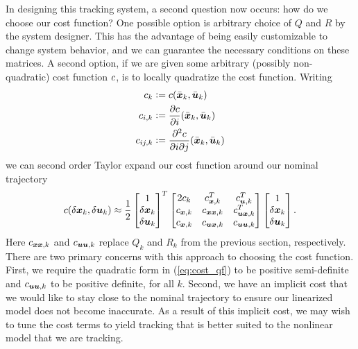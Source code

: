 In designing this tracking system, a second question now occurs: how do we choose our cost function? One possible option is arbitrary choice of $Q$ and $R$ by the system designer. This has the advantage of being easily customizable to change system behavior, and we can guarantee the necessary conditions on these matrices. A second option, if we are given some arbitrary (possibly non-quadratic) cost function $c$, is to locally quadratize the cost function. Writing 
\begin{align}
    \label{eq:cost_derivs}
    c_{k} &\vcentcolon= c(\bar{\bm{x}}_k,\bar{\bm{u}}_k)\\
    c_{i,k} &\vcentcolon= \frac{\partial c}{\partial i}(\bar{\bm{x}}_k,\bar{\bm{u}}_k)\\
    c_{ij,k} &\vcentcolon= \frac{\partial^2 c}{\partial i \partial j}(\bar{\bm{x}}_k,\bar{\bm{u}}_k)
\end{align}
we can second order Taylor expand our cost function around our nominal trajectory
\begin{equation}
    c(\delta \bm{x}_k, \delta \bm{u}_k) \approx 
\frac{1}{2}
    \begin{bmatrix}
    1\\
    \delta \bm{x}_k\\
    \delta \bm{u}_k
\end{bmatrix}^T
    \begin{bmatrix}
    2 c_k & c_{\bm{x},k}^T & c_{\bm{u},k}^T\\
    c_{\bm{x},k} & c_{\bm{x} \bm{x},k} & c_{\bm{u} \bm{x},k}^T\\
    c_{\bm{x},k} & c_{\bm{u} \bm{x},k} & c_{\bm{u} \bm{u},k}
\end{bmatrix}
    \begin{bmatrix}
    1\\
    \delta \bm{x}_k\\
    \delta \bm{u}_k
\end{bmatrix}.
\label{eq:cost_qf}
\end{equation}
Here $c_{\bm{x} \bm{x},k}$ and $c_{\bm{u} \bm{u},k}$ replace $Q_k$ and $R_k$ from the previous section, respectively. There are two primary concerns with this approach to choosing the cost function. First, we require the quadratic form in (\ref{eq:cost_qf}) to be positive semi-definite and $c_{\bm{u} \bm{u},k}$ to be positive definite, for all $k$. Second, we have an implicit cost that we would like to stay close to the nominal trajectory to ensure our linearized model does not become inaccurate. As a result of this implicit cost, we may wish to tune the cost terms to yield tracking that is better suited to the nonlinear model that we are tracking. 

